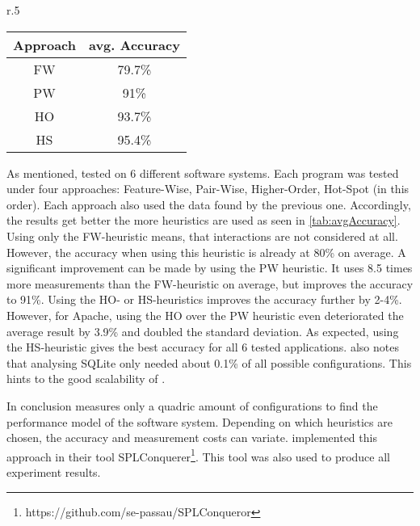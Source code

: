 \begin{wrapfigure}{r}{.5\textwidth}
	\centering
	\setlength{}
	\label{tab:avgAccuracy}
	\begin{tabular}{c|c}
		Approach&avg. Accuracy\\\midrule[1pt]
		FW&79.7\%\\\hline
		PW&91\%\\\hline
		HO&93.7\%\\\hline
		HS&95.4\%\\\hline
	\end{tabular}
\end{wrapfigure}\noindent
As mentioned, \citet{AutomatedFeatureDetectionSiegmund2012} tested \AFID on 6 different software systems. Each program was tested under four approaches: Feature-Wise, Pair-Wise, Higher-Order, Hot-Spot (in this order). Each approach also used the data found by the previous one. Accordingly, the results get better the more heuristics are used as seen in \cref{tab:avgAccuracy}. Using only the FW-heuristic means, that interactions are not considered at all. However, the accuracy when using this heuristic is already at 80\% on average. A significant improvement can be made by using the PW heuristic. It uses  8.5 times more measurements than the FW-heuristic on average, but improves the accuracy to 91\%. Using the HO- or HS-heuristics improves the accuracy further by 2-4\%. However, for Apache, using the HO over the PW heuristic even deteriorated the average result by 3.9\% and doubled the standard deviation. As expected, using the HS-heuristic gives the best accuracy for all 6 tested applications. \citet{AutomatedFeatureDetectionSiegmund2012} also notes that analysing SQLite only needed about 0.1\% of all possible configurations. This hints to the good scalability of \AFID.

In conclusion \AFID measures only a quadric amount of configurations to find the performance model of the software system. Depending on which heuristics are chosen, the accuracy and measurement costs can variate. \citet{AutomatedFeatureDetectionSiegmund2012} implemented this approach in their tool SPLConquerer\footnote{https://github.com/se-passau/SPLConqueror}. This tool was also used to produce all experiment results.